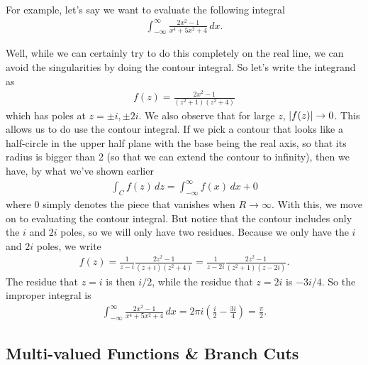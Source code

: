 \documentclass{book}
\theoremstyle{definition}
\newcommand{\f}[2]{\frac{#1}{#2}}
\newcommand{\lp}{\left(}
\newcommand{\rp}{\right)}
\begin{document}
For example, let's say we want to evaluate the following integral
\begin{align}
\int^\infty_{-\infty} \f{2x^2 - 1}{x^4 + 5x^2 + 4}\,dx.
\end{align}

Well, while we can certainly try to do this completely on the real line, we can avoid the singularities by doing the contour integral. So let's write the integrand as
\begin{align}
f(z) = \f{2x^2 - 1}{(z^2 + 1)(z^2 + 4)}
\end{align}
which has poles at $z = \pm i, \pm 2i$. We also observe that for large $z$, $\abs{f(z)}\to 0$. This allows us to do use the contour integral. If we pick a contour that looks like a half-circle in the upper half plane with the base being the real axis, so that its radius is bigger than 2 (so that we can extend the contour to infinity), then we have, by what we've shown earlier
\begin{align}
\int_C f(z)\,dz = \int^\infty_{-\infty}f(x)\,dx + 0
\end{align}
where $0$ simply denotes the piece that vanishes when $R \to \infty$. With this, we move on to evaluating the contour integral. But notice that the contour includes only the $i$ and $2i$ poles, so we will only have two residues. Because we only have the $i$ and $2i$ poles, we write
\begin{align}
f(z) = \f{1}{z-i}\f{2z^2 - 1}{(z+i)(z^2 + 4)} = \f{1}{z - 2i}\f{2z^2 - 1}{(z^2 + 1)(z - 2i)}.
\end{align}
The residue that $z = i$ is then $i/2$, while the residue that $z = 2i$ is $-3i/4$. So the improper integral is
\begin{align}
\int^\infty_{-\infty} \f{2x^2 - 1}{x^4 + 5x^2 + 4}\,dx = 2\pi i\lp \f{i}{2} - \f{3i}{4} \rp = \f{\pi}{2}.
\end{align}










\newpage




\subsection{Multi-valued Functions \& Branch Cuts}
\end{document}
